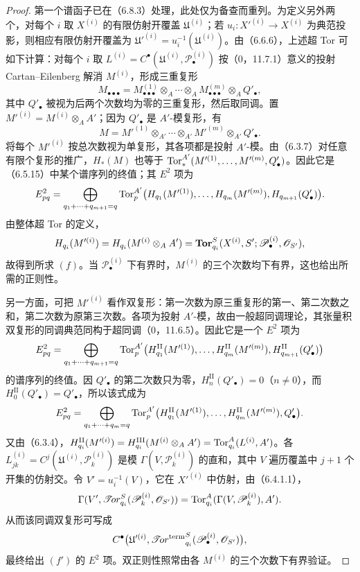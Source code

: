 \begin{proof}
第一个谱函子已在（6.8.3）处理，此处仅为备查而重列。为定义另外两个，对每个 $i$ 取 $X^{(i)}$ 的有限仿射开覆盖 $\mathfrak U^{(i)}$；若 $u_i:X'^{(i)}\to X^{(i)}$ 为典范投影，则相应有限仿射开覆盖为 $\mathfrak U'^{(i)}=u_i^{-1}(\mathfrak U^{(i)})$。由（6.6.6），上述超 Tor 可如下计算：对每个 $i$ 取 $L^{(i)}=C^\bullet(\mathfrak U^{(i)},\mathscr P^{(i)}_\bullet)$ 按（0，11.7.1）意义的投射 Cartan--Eilenberg 解消 $M^{(i)}$，形成三重复形
\[
 M_{\bullet\bullet\bullet}
 =M^{(1)}_{\bullet\bullet\bullet}\otimes_A\cdots\otimes_AM^{(m)}_{\bullet\bullet\bullet}\otimes_AQ'_\bullet,
\]
其中 $Q'_\bullet$ 被视为后两个次数均为零的三重复形，然后取同调。置 $M'^{(i)}=M^{(i)}\otimes_AA'$；因为 $Q'_\bullet$ 是 $A'$-模复形，有
\[
 M=M'^{(1)}\otimes_{A'}\cdots\otimes_{A'}M'^{(m)}\otimes_{A'}Q'_\bullet.
\]
将每个 $M'^{(i)}$ 按总次数视为单复形，其各项都是投射 $A'$-模。由（6.3.7）对任意有限个复形的推广，$H_*(M)$ 也等于
$\operatorname{Tor}_*^{A'}(M'^{(1)},\ldots,M'^{(m)},Q'_\bullet)$。因此它是（6.5.15）中某个谱序列的终值；其 $E^2$ 项为
\[
 E^2_{pq}=\bigoplus_{q_1+\cdots+q_{m+1}=q}
 \operatorname{Tor}_p^{A'}\bigl(H_{q_1}(M'^{(1)}),\ldots,H_{q_m}(M'^{(m)}),
                   H_{q_{m+1}}(Q'_\bullet)\bigr).
\]
由整体超 Tor 的定义，
\[
 H_{q_i}(M'^{(i)})=H_{q_i}(M^{(i)}\otimes_AA')
 =\operatorname{\mathbf{Tor}}_{q_i}^S(X^{(i)},S';\mathscr P^{(i)}_\bullet,\mathscr O_{S'}),
\]
故得到所求 $(f)$。当 $\mathscr P^{(i)}_\bullet$ 下有界时，$M^{(i)}$ 的三个次数均下有界，这也给出所需的正则性。

另一方面，可把 $M'^{(i)}$ 看作双复形：第一次数为原三重复形的第一、第二次数之和，第二次数为原第三次数。各项为投射 $A'$-模，故由一般超同调理论，其张量积双复形的同调典范同构于超同调（0，11.6.5）。因此它是一个 $E^2$ 项为
\[
 E^2_{pq}=\bigoplus_{q_1+\cdots+q_{m+1}=q}\operatorname{Tor}_p^{A'}
 \bigl(H^{\mathrm{II}}_{q_1}(M'^{(1)}),\ldots,
       H^{\mathrm{II}}_{q_m}(M'^{(m)}),H^{\mathrm{II}}_{q_{m+1}}(Q'_\bullet)\bigr)
\]
的谱序列的终值。因 $Q'_\bullet$ 的第二次数只为零，$H_n^{\mathrm{II}}(Q'_\bullet)=0$（$n\ne0$），而 $H_0^{\mathrm{II}}(Q'_\bullet)=Q'_\bullet$，所以该式成为
\[
 E^2_{pq}=\bigoplus_{q_1+\cdots+q_m=q}\operatorname{Tor}_p^{A'}
 \bigl(H^{\mathrm{II}}_{q_1}(M'^{(1)}),\ldots,
       H^{\mathrm{II}}_{q_m}(M'^{(m)}),Q'_\bullet\bigr).
\]
又由（6.3.4），$H^{\mathrm{II}}_{q_i}(M'^{(i)})=
H^{\mathrm{III}}_{q_i}(M^{(i)}\otimes_AA')=\operatorname{Tor}_{q_i}^A(L^{(i)},A')$。各 $L^{(i)}_{jk}=C^j(\mathfrak U^{(i)},\mathscr P^{(i)}_k)$ 是模 $\Gamma(V,\mathscr P^{(i)}_k)$ 的直和，其中 $V$ 遍历覆盖中 $j+1$ 个开集的仿射交。令 $V'=u_i^{-1}(V)$，它在 $X'^{(i)}$ 中仿射，由（6.4.1.1），
\[
 \Gamma(V',\mathscr{T}\!or_{q_i}^S(\mathscr P^{(i)}_k,\mathscr O_{S'}))
 =\operatorname{Tor}_{q_i}^A(\Gamma(V,\mathscr P^{(i)}_k),A').
\]
从而该同调双复形可写成
\[
 C^\bullet\bigl(\mathfrak U'^{(i)},
                \mathop{\mathscr{T}\!or^{\mathrm{term}}}\nolimits_{q_i}^S(\mathscr P^{(i)}_\bullet,\mathscr O_{S'})\bigr),
\]
最终给出 $(f')$ 的 $E^2$ 项。双正则性照常由各 $M^{(i)}$ 的三个次数下有界验证。
\end{proof}

